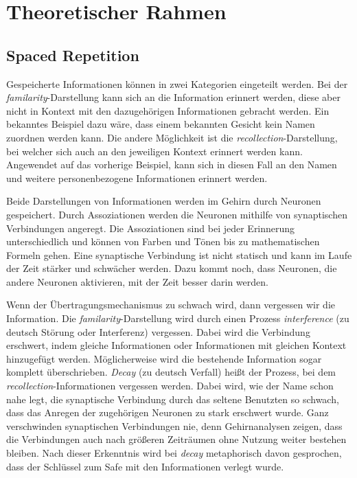 \chapter{Theoretischer Rahmen}
\section{Spaced Repetition}
Gespeicherte Informationen können in zwei Kategorien eingeteilt werden. Bei der  \textit{familarity}-Darstellung kann sich an die Information erinnert werden, diese aber nicht in Kontext mit den dazugehörigen Informationen gebracht werden. Ein bekanntes Beispiel dazu wäre, dass einem bekannten Gesicht kein Namen zuordnen werden kann. Die andere Möglichkeit ist die \textit{recollection}-Darstellung, bei welcher sich auch an den jeweiligen Kontext erinnert werden kann. Angewendet auf das vorherige Beispiel, kann sich in diesen Fall an den Namen und weitere personenbezogene Informationen erinnert werden.\cite{SA:Forget}

Beide Darstellungen von Informationen werden im Gehirn durch Neuronen gespeichert. Durch Assoziationen werden die Neuronen mithilfe von synaptischen Verbindungen angeregt. Die Assoziationen sind bei jeder Erinnerung unterschiedlich und können von Farben und Tönen bis zu mathematischen Formeln gehen. Eine synaptische Verbindung ist nicht statisch und kann im Laufe der Zeit stärker und schwächer werden. Dazu kommt noch, dass Neuronen, die andere Neuronen aktivieren, mit der Zeit besser darin werden.\cite{SDW:Vergessen}

Wenn der Übertragungsmechanismus zu schwach wird, dann vergessen wir die Information. Die \textit{familarity}-Darstellung wird durch einen Prozess \textit{interference} (zu deutsch Störung oder Interferenz) vergessen. Dabei wird die Verbindung erschwert, indem gleiche Informationen oder Informationen mit gleichen Kontext hinzugefügt werden. Möglicherweise wird die bestehende Information sogar komplett überschrieben. \textit{Decay} (zu deutsch Verfall) heißt der Prozess, bei dem \textit{recollection}-Informationen vergessen werden. Dabei wird, wie der Name schon nahe legt, die synaptische Verbindung durch das seltene Benutzten so schwach, dass das Anregen der zugehörigen Neuronen zu stark erschwert wurde. Ganz verschwinden synaptischen Verbindungen nie, denn Gehirnanalysen zeigen, dass die Verbindungen auch nach größeren Zeiträumen ohne Nutzung weiter bestehen bleiben. Nach dieser Erkenntnis wird bei \textit{decay} metaphorisch davon gesprochen, dass der Schlüssel zum Safe mit den Informationen verlegt wurde.\cite{SA:Forget}\cite{SDW:Vergessen}

